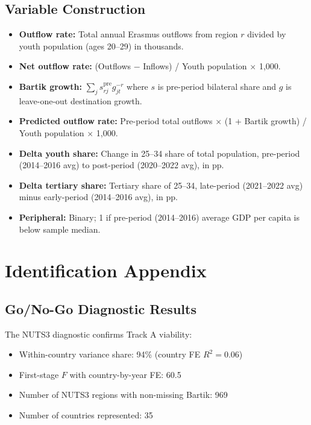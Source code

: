\documentclass[12pt]{article}
\begin{document}
\subsection{Variable Construction}

\begin{itemize}
\item \textbf{Outflow rate:} Total annual Erasmus outflows from region $r$ divided by youth population (ages 20--29) in thousands.
\item \textbf{Net outflow rate:} (Outflows $-$ Inflows) / Youth population $\times$ 1,000.
\item \textbf{Bartik growth:} $\sum_j s_{rj}^{\text{pre}} g_{jt}^{-r}$ where $s$ is pre-period bilateral share and $g$ is leave-one-out destination growth.
\item \textbf{Predicted outflow rate:} Pre-period total outflows $\times$ (1 + Bartik growth) / Youth population $\times$ 1,000.
\item \textbf{Delta youth share:} Change in 25--34 share of total population, pre-period (2014--2016 avg) to post-period (2020--2022 avg), in pp.
\item \textbf{Delta tertiary share:} Tertiary share of 25--34, late-period (2021--2022 avg) minus early-period (2014--2016 avg), in pp.
\item \textbf{Peripheral:} Binary; 1 if pre-period (2014--2016) average GDP per capita is below sample median.
\end{itemize}


\section{Identification Appendix}
\label{app:identification}

\subsection{Go/No-Go Diagnostic Results}

The NUTS3 diagnostic confirms Track A viability:
\begin{itemize}
\item Within-country variance share: 94\% (country FE $R^2 = 0.06$)
\item First-stage $F$ with country-by-year FE: 60.5
\item Number of NUTS3 regions with non-missing Bartik: 969
\item Number of countries represented: 35
\end{itemize}
\end{document}
